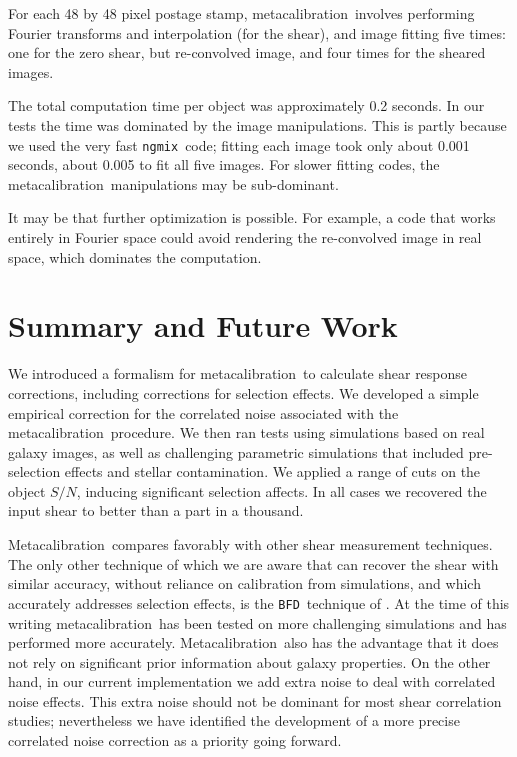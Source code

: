\documentclass[iop]{emulateapj}
\newcommand{\snr}{$S/N$}
\newcommand{\mcal}{metacalibration}
\newcommand{\Mcal}{Metacalibration}
\newcommand{\ngmix}{\texttt{ngmix}}
\newcommand{\bfd}{\texttt{BFD}}
\begin{document}
For each 48 by 48 pixel postage stamp, \mcal\ involves performing Fourier
transforms and interpolation (for the shear), and image fitting five times: one
for the zero shear, but re-convolved image, and four times for the sheared
images.

The total computation time per object was approximately 0.2 seconds.  In our
tests the time was dominated by the image manipulations.  This is partly
because we used the very fast \ngmix\ code; fitting each image took only about
0.001 seconds, about 0.005 to fit all five images.  For slower fitting codes,
the \mcal\ manipulations may be sub-dominant.

It may be that further optimization is possible.  For example, a code that
works entirely in Fourier space could avoid rendering the re-convolved image in
real space, which dominates the computation.

\section{Summary and Future Work} \label{sec:summary}

We introduced a formalism for \mcal\ to calculate shear response corrections,
including corrections for selection effects. We developed a simple empirical
correction for the correlated noise associated with the \mcal\ procedure.  We
then ran tests using simulations based on real galaxy images, as well as
challenging parametric simulations that included pre-selection effects and
stellar contamination.  We applied a range of cuts on the object \snr, inducing
significant selection affects.  In all cases we recovered the input shear to
better than a part in a thousand.

\Mcal\ compares favorably with other shear measurement techniques.  The only
other technique of which we are aware that can recover the shear with similar
accuracy, without reliance on calibration from simulations, and which
accurately addresses selection effects, is the \bfd\ technique of
\cite{bfd2016}.  At the time of this writing \mcal\ has been tested on more
challenging simulations and has performed more accurately.  \Mcal\ also has the
advantage that it does not rely on significant prior information about galaxy
properties.  On the other hand, in our current implementation we add extra
noise to deal with correlated noise effects.  This extra noise should not be
dominant for most shear correlation studies; nevertheless we have identified
the development of a more precise correlated noise correction as a priority
going forward.
\end{document}
